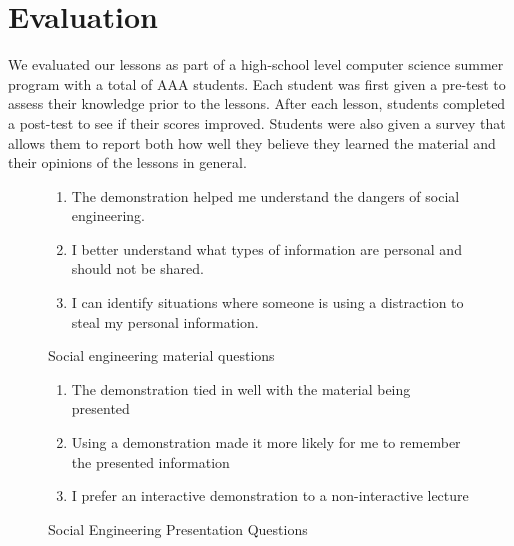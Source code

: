 \section{Evaluation}
\label{SEC:evaluation}

We evaluated our lessons as part of a high-school level computer science
summer program with a total of AAA students.  Each student was first given
a pre-test to assess their knowledge prior to the lessons.  After each
lesson, students completed a post-test to see if their scores improved.
Students were also given a survey that allows them to report both how well
they believe they learned the material and their opinions of the lessons in
general.

\begin{figure}[H]
\begin{enumerate}

  \item{The demonstration helped me understand the dangers of social
    engineering.}

  \item{I better understand what types of
    information are personal and should not
    be shared.}

  \item{I can identify situations where someone is using a distraction
    to steal my personal information.}

\end{enumerate}
  \caption{Social engineering material questions}
\end{figure}

\begin{figure}[H]
\begin{enumerate}

  \item{The demonstration tied in well with the material being presented}

  \item{Using a demonstration made it more likely for me to remember the
    presented information}

  \item{I prefer an interactive demonstration to a non-interactive lecture}


\end{enumerate}
  \caption{Social Engineering Presentation Questions}
\end{figure}


%
%
%
%
%
%
%
%
%
%
%
%
